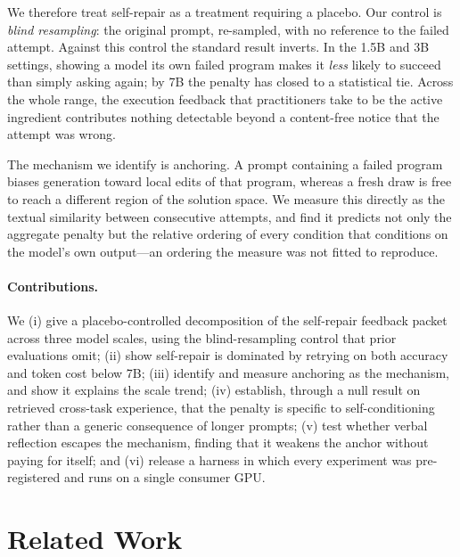 We therefore treat self-repair as a treatment requiring a placebo. Our control
is \emph{blind resampling}: the original prompt, re-sampled, with no reference
to the failed attempt. Against this control the standard result inverts. In the
1.5B and 3B settings, showing a model its own failed program makes it
\emph{less} likely to succeed than simply asking again; by 7B the penalty has
closed to a statistical tie. Across the whole range, the execution feedback
that practitioners take to be the active ingredient contributes nothing
detectable beyond a content-free notice that the attempt was wrong.

The mechanism we identify is anchoring. A prompt containing a failed program
biases generation toward local edits of that program, whereas a fresh draw is
free to reach a different region of the solution space. We measure this
directly as the textual similarity between consecutive attempts, and find it
predicts not only the aggregate penalty but the relative ordering of every
condition that conditions on the model's own output---an ordering the measure
was not fitted to reproduce.

\paragraph{Contributions.}
We (i) give a placebo-controlled decomposition of the self-repair feedback
packet across three model scales, using the blind-resampling control that prior
evaluations omit; (ii) show self-repair is dominated by retrying on both
accuracy and token cost below 7B; (iii) identify and measure anchoring as the
mechanism, and show it explains the scale trend; (iv) establish, through a null
result on retrieved cross-task experience, that the penalty is specific to
self-conditioning rather than a generic consequence of longer prompts; (v)
test whether verbal reflection escapes the mechanism, finding that it weakens
the anchor without paying for itself; and (vi) release a harness in which every
experiment was pre-registered and runs on a single consumer GPU.

\section{Related Work}
\label{sec:related}

